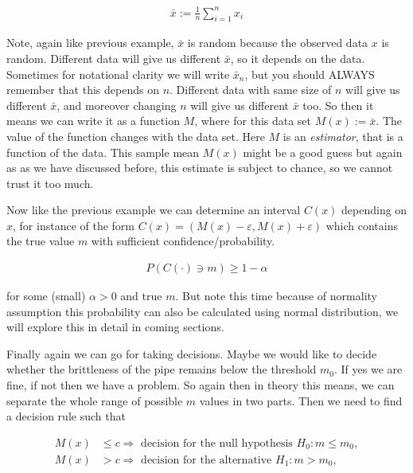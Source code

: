 \documentclass[ 11pt,%
				a4paper,%
				twoside,%
				headinclude,%
				footinclude = true,%
				cleardoublepage = empty,%
				reqno]{scrbook}
\begin{document}
\begin{example}
    \begin{align*}
        \bar{x}:=\frac{1}{n} \sum_{i=1}^{n} x_{i}
    \end{align*}

    Note, again like previous example, $\bar{x}$ is random because the observed data $x$ is random. Different data will give us different $\bar{x}$, so it depends on the data. Sometimes for notational clarity we will write $\bar{x}_n$, but you should ALWAYS remember that this depends on $n$. Different data with same size of $n$ will give us different $\bar{x}$, and moreover changing $n$ will give us different $\bar{x}$ too.  So then it means we can write it as a function $M$, where for this data set $M(x) := \bar{x}$. The value of the function changes with the data set. Here $M$ is an \emph{estimator}, that is a function of the data. This sample mean $M(x)$ might be a good guess but again as as we have discussed before, this estimate is subject to chance, so we cannot trust it too much.


\textbf{}

    Now like the previous example we can determine an interval $C(x)$ depending on $x$, for instance of the form $C(x)=( M(x)-\varepsilon, M(x)+\varepsilon)$ which contains the true value $m$ with sufficient confidence/probability. 

    \begin{align*}
        P(C(\cdot) \ni m) \geq 1-\alpha
    \end{align*}

    for some (small) $\alpha>0$ and true $m$. But note this time because of normality assumption this probability can also be calculated using normal distribution, we will explore this in detail in coming sections.


\textbf{}
     
    Finally again we can go for taking decisions. Maybe we would like to decide whether the brittleness of the pipe remains below the threshold $m_{0}$. If yes we are fine, if not then we have a problem. So again then in theory this means, we can separate the whole range of possible $m$ values in two parts. Then we need to find a decision rule such that 

    \begin{align*}
    M(x) &\leq c \Rightarrow \text { decision for the null hypothesis } H_{0}: m \leq m_{0},  \\
    M(x)&>c \Rightarrow \text { decision for the alternative } H_{1}: m>m_{0},
    \end{align*}
   



\end{example}
\end{document}
